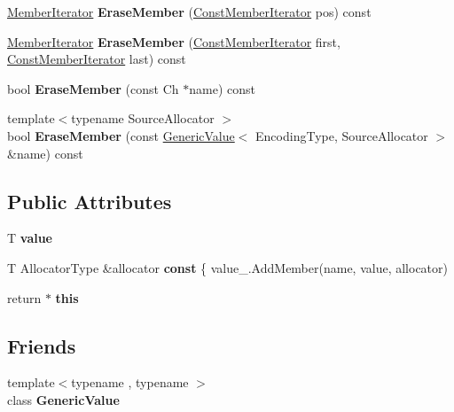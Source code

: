 \begin{DoxyCompactItemize}
\hyperlink{class_generic_member_iterator}{Member\+Iterator} {\bfseries Erase\+Member} (\hyperlink{class_generic_member_iterator}{Const\+Member\+Iterator} pos) const
\item 
\mbox{\label{class_generic_object_a67f85d2da462287dead8e35f2ac974b5}} 
\hyperlink{class_generic_member_iterator}{Member\+Iterator} {\bfseries Erase\+Member} (\hyperlink{class_generic_member_iterator}{Const\+Member\+Iterator} first, \hyperlink{class_generic_member_iterator}{Const\+Member\+Iterator} last) const
\item 
\mbox{\label{class_generic_object_af0d31a8547051624449494a339b20107}} 
bool {\bfseries Erase\+Member} (const Ch $\ast$name) const
\item 
\mbox{\label{class_generic_object_a4cd6f90444f20cc9d5577747d3968da4}} 
{\footnotesize template$<$typename Source\+Allocator $>$ }\\bool {\bfseries Erase\+Member} (const \hyperlink{class_generic_value}{Generic\+Value}$<$ Encoding\+Type, Source\+Allocator $>$ \&name) const
\end{DoxyCompactItemize}
\subsection*{Public Attributes}
\begin{DoxyCompactItemize}
\item 
\mbox{\label{class_generic_object_a131538fbbacbc0a3a5ad15dbea66394f}} 
T {\bfseries value}
\item 
\mbox{\label{class_generic_object_af70c9646b5e422306c33e98b3d8783a7}} 
T Allocator\+Type \&allocator {\bfseries const} \{ value\+\_\+.\+Add\+Member(name, value, allocator)
\item 
\mbox{\label{class_generic_object_a719a0e5501da825e6f86ce12b46446cb}} 
return $\ast$ {\bfseries this}
\end{DoxyCompactItemize}
\subsection*{Friends}
\begin{DoxyCompactItemize}
\item 
\mbox{\label{class_generic_object_a899449e1a645b5e377af059fb61113d8}} 
{\footnotesize template$<$typename , typename $>$ }\\class {\bfseries Generic\+Value}
\end{DoxyCompactItemize}


